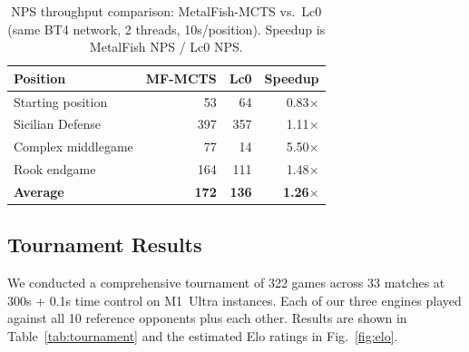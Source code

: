 \documentclass{svproc}
\begin{document}
\begin{table}[!htbp]
\centering
\caption{NPS throughput comparison: MetalFish-MCTS vs.\ Lc0 (same BT4 network, 2 threads, 10s/position). Speedup is MetalFish NPS / Lc0 NPS.}
\label{tab:nps}
\begin{tabular}{lrrr}
\toprule
\textbf{Position} & \textbf{MF-MCTS} & \textbf{Lc0} & \textbf{Speedup} \\
\midrule
Starting position  & 53   & 64  & 0.83$\times$ \\
Sicilian Defense   & 397  & 357 & 1.11$\times$ \\
Complex middlegame & 77   & 14  & 5.50$\times$ \\
Rook endgame       & 164  & 111 & 1.48$\times$ \\
\midrule
\textbf{Average}   & \textbf{172} & \textbf{136} & \textbf{1.26$\times$} \\
\bottomrule
\end{tabular}
\end{table}

\FloatBarrier
\subsection{Tournament Results}
\label{sec:eval-tournament}

We conducted a comprehensive tournament of 322 games across 33 matches at 300s + 0.1s time control on M1~Ultra instances. Each of our three engines played against all 10 reference opponents plus each other. Results are shown in Table~\ref{tab:tournament} and the estimated Elo ratings in Fig.~\ref{fig:elo}.
\end{document}
